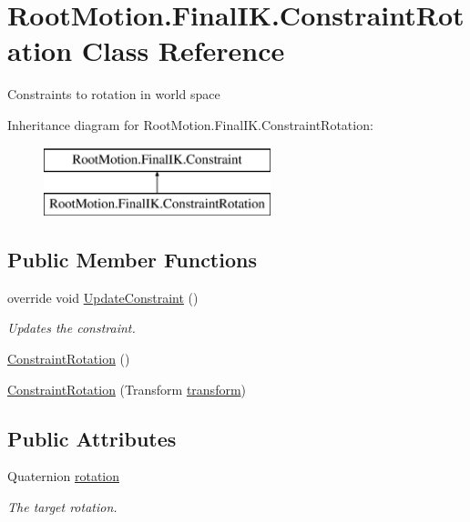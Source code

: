 \hypertarget{class_root_motion_1_1_final_i_k_1_1_constraint_rotation}{}\section{Root\+Motion.\+Final\+I\+K.\+Constraint\+Rotation Class Reference}
\label{class_root_motion_1_1_final_i_k_1_1_constraint_rotation}


Constraints to rotation in world space  


Inheritance diagram for Root\+Motion.\+Final\+I\+K.\+Constraint\+Rotation\+:\begin{figure}[H]
\begin{center}
\leavevmode
\includegraphics[height=2.000000cm]{class_root_motion_1_1_final_i_k_1_1_constraint_rotation}
\end{center}
\end{figure}
\subsection*{Public Member Functions}
\begin{DoxyCompactItemize}
\item 
override void \mbox{\hyperlink{class_root_motion_1_1_final_i_k_1_1_constraint_rotation_a0207bba5082e69f78a72cf7154431159}{Update\+Constraint}} ()
\begin{DoxyCompactList}\small\item\em Updates the constraint. \end{DoxyCompactList}\item 
\mbox{\hyperlink{class_root_motion_1_1_final_i_k_1_1_constraint_rotation_a131a9db813da271bc7737e0bc88ba6d9}{Constraint\+Rotation}} ()
\item 
\mbox{\hyperlink{class_root_motion_1_1_final_i_k_1_1_constraint_rotation_af448a801e0173f01d4b464a13872efe9}{Constraint\+Rotation}} (Transform \mbox{\hyperlink{class_root_motion_1_1_final_i_k_1_1_constraint_a2fe5a6e41ac6da0e5cb97a231696f937}{transform}})
\end{DoxyCompactItemize}
\subsection*{Public Attributes}
\begin{DoxyCompactItemize}
\item 
Quaternion \mbox{\hyperlink{class_root_motion_1_1_final_i_k_1_1_constraint_rotation_a5b5e7172beecd33bc7002e853eeb6412}{rotation}}
\begin{DoxyCompactList}\small\item\em The target rotation. \end{DoxyCompactList}\end{DoxyCompactItemize}
